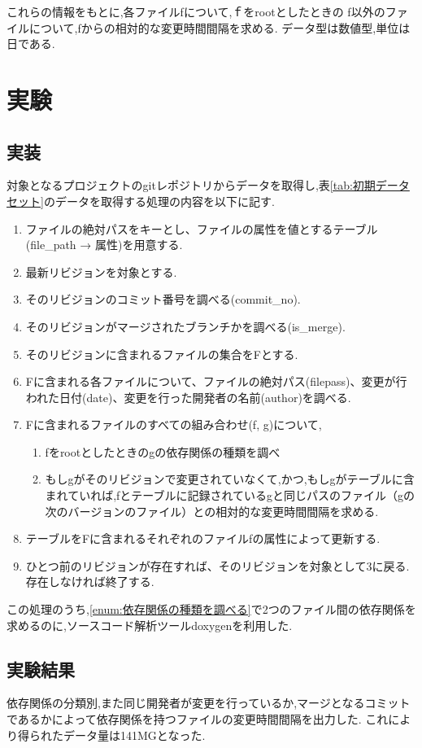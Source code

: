 \documentclass{fose2016}           %
\begin{document}
これらの情報をもとに,各ファイルfについて,ｆをrootとしたときの
f以外のファイルについて,fからの相対的な変更時間間隔を求める.
データ型は数値型,単位は日である.
\section{実験}\label{実験}

\subsection{実装}
対象となるプロジェクトのgitレポジトリからデータを取得し,表\ref{tab:初期データセット}のデータを取得する処理の内容を以下に記す.
\begin{enumerate}
\item ファイルの絶対パスをキーとし、ファイルの属性を値とするテーブル(file\_path → 属性)を用意する.
\item 最新リビジョンを対象とする.
\item そのリビジョンのコミット番号を調べる(commit\_no).
\item そのリビジョンがマージされたブランチかを調べる(is\_merge).
\item そのリビジョンに含まれるファイルの集合をFとする.
\item Fに含まれる各ファイルについて、ファイルの絶対パス(filepass)、変更が行われた日付(date)、変更を行った開発者の名前(author)を調べる.
\item Fに含まれるファイルのすべての組み合わせ(f, g)について,
\begin{enumerate}
\item fをrootとしたときのgの依存関係の種類を調べ\label{enum:依存関係の種類を調べる}
\item もしgがそのリビジョンで変更されていなくて,かつ,もしgがテーブルに含まれていれば,fとテーブルに記録されているgと同じパスのファイル（gの次のバージョンのファイル）との相対的な変更時間間隔を求める.
\end{enumerate}
\item テーブルをFに含まれるそれぞれのファイルfの属性によって更新する.
\item ひとつ前のリビジョンが存在すれば、そのリビジョンを対象として3に戻る.存在しなければ終了する.
\end{enumerate}

この処理のうち,\ref{enum:依存関係の種類を調べる}で2つのファイル間の依存関係を求めるのに,ソースコード解析ツールdoxygenを利用した.

\subsection{実験結果}
依存関係の分類別,また同じ開発者が変更を行っているか,マージとなるコミットであるかによって依存関係を持つファイルの変更時間間隔を出力した.
これにより得られたデータ量は141MGとなった.
\end{document}
